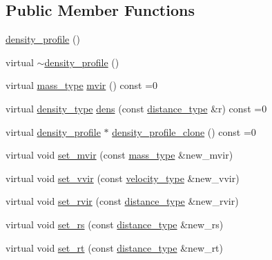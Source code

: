 \subsection*{Public Member Functions}
\begin{DoxyCompactItemize}
\item 
\hyperlink{classIceBRG_1_1density__profile_ad1ee6b3b861e5b46c958e516ccea87fc}{density\+\_\+profile} ()
\item 
virtual \hyperlink{classIceBRG_1_1density__profile_a4bc455459dcfcf20b659beeccae7f66c}{$\sim$density\+\_\+profile} ()
\item 
virtual \hyperlink{namespaceIceBRG_a1be72ac4918a9b029f2eefa084213e35}{mass\+\_\+type} \hyperlink{classIceBRG_1_1density__profile_aa62204b8ca04779f4477183f873b2aff}{mvir} () const  =0
\item 
virtual \hyperlink{namespaceIceBRG_a9f5e5cdd641bb4c06f7305dfb5ae0238}{density\+\_\+type} \hyperlink{classIceBRG_1_1density__profile_ac47dc183eb719a6aea32e981a6f79a30}{dens} (const \hyperlink{namespaceIceBRG_a45499647eb87e24c10ab32c628711cec}{distance\+\_\+type} \&r) const  =0
\item 
virtual \hyperlink{classIceBRG_1_1density__profile}{density\+\_\+profile} $\ast$ \hyperlink{classIceBRG_1_1density__profile_a8a6a4033eeadf4b70ee174f293639c80}{density\+\_\+profile\+\_\+clone} () const  =0
\item 
virtual void \hyperlink{classIceBRG_1_1density__profile_ae0230aa967a251d3ce5f360514e1690d}{set\+\_\+mvir} (const \hyperlink{namespaceIceBRG_a1be72ac4918a9b029f2eefa084213e35}{mass\+\_\+type} \&new\+\_\+mvir)
\item 
virtual void \hyperlink{classIceBRG_1_1density__profile_ae96d1142416f1eec0cf5e953c9dd19d4}{set\+\_\+vvir} (const \hyperlink{namespaceIceBRG_a34f8ef3b46f3408301e3c28197095eff}{velocity\+\_\+type} \&new\+\_\+vvir)
\item 
virtual void \hyperlink{classIceBRG_1_1density__profile_af98da3e96b5a4a023f749d3f5467afb0}{set\+\_\+rvir} (const \hyperlink{namespaceIceBRG_a45499647eb87e24c10ab32c628711cec}{distance\+\_\+type} \&new\+\_\+rvir)
\item 
virtual void \hyperlink{classIceBRG_1_1density__profile_a75a38a12721b8fcf359e768d1e2986b0}{set\+\_\+rs} (const \hyperlink{namespaceIceBRG_a45499647eb87e24c10ab32c628711cec}{distance\+\_\+type} \&new\+\_\+rs)
\item 
virtual void \hyperlink{classIceBRG_1_1density__profile_ae740e08ea853866ee90323193877f5e7}{set\+\_\+rt} (const \hyperlink{namespaceIceBRG_a45499647eb87e24c10ab32c628711cec}{distance\+\_\+type} \&new\+\_\+rt)

\end{DoxyCompactItemize}

